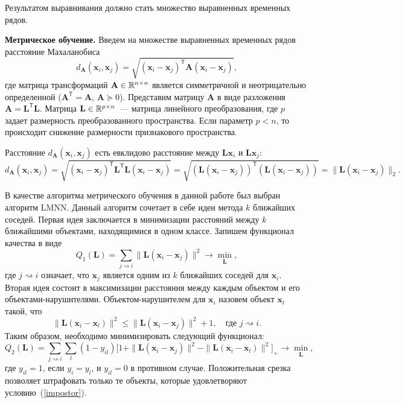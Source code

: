 Результатом выравнивания должно стать множество выравненных временных рядов.

\textbf{Метрическое обучение.}
Введем на множестве выравненных временных рядов расстояние Махаланобиса
\[
d_\mathbf{A} (\mathbf{x}_i, \mathbf{x}_j) = \sqrt{(\mathbf{x}_i - \mathbf{x}_j)^\mathsf{T} \mathbf{A} (\mathbf{x}_i - \mathbf{x}_j)},
\]
где матрица трансформаций $\mathbf{A} \in \mathbb{R}^{n \times n}$ является симметричной и неотрицательно определенной ($\mathbf{A}^\mathsf{T} = \mathbf{A}$, $\mathbf{A} \succeq 0$).
Представим матрицу $\mathbf{A}$ в виде разложения $\mathbf{A} = \mathbf{L}^\mathsf{T}  \mathbf{L}$.
Матрица $\mathbf{L} \in \mathbb{R}^{p \times n}$~--- матрица линейного преобразования, где $p$ задает размерность преобразованного пространства. Если параметр $p < n$, то происходит снижение размерности признакового пространства.

Расстояние $d_\mathbf{A} (\mathbf{x}_i, \mathbf{x}_j)$ есть евклидово расстояние между $\mathbf{Lx}_i$ и $\mathbf{Lx}_j$:
\[
d_\mathbf{A} (\mathbf{x}_i, \mathbf{x}_j) = \sqrt{(\mathbf{x}_i - \mathbf{x}_j)^\mathsf{T} \mathbf{L}^\mathsf{T} \mathbf{L} (\mathbf{x}_i - \mathbf{x}_j)} = \sqrt{(\mathbf{L} (\mathbf{x}_i - \mathbf{x}_j))^\mathsf{T} (\mathbf{L} (\mathbf{x}_i - \mathbf{x}_j))} = \|\mathbf{L} (\mathbf{x}_i - \mathbf{x}_j)\|_2.
\]

В качестве алгоритма метрического обучения в данной работе был выбран алгоритм LMNN. Данный алгоритм сочетает в себе идеи метода $k$ ближайших соседей. Первая идея заключается в минимизации расстояний между $k$ ближайшими объектами, находящимися в одном классе. Запишем функционал качества в виде
\[
Q_1(\mathbf{L}) = \sum_{j \rightsquigarrow i} \|\mathbf{L}(\mathbf{x}_i - \mathbf{x}_j)\|^2 \rightarrow \min_{\mathbf{L}},
\]
где $j \rightsquigarrow i$ означает, что $\mathbf{x}_j$ является одним из $k$ ближайших соседей для $\mathbf{x}_i$.
Вторая идея состоит в максимизации расстояния между каждым объектом и его объектами-нарушителями. Объектом-нарушителем для $\mathbf{x}_i$ назовем объект $\mathbf{x}_l$ такой, что
\begin{equation}
\label{impostor}
\|\mathbf{L}(\mathbf{x}_i - \mathbf{x}_l)\|^2 \leq \|\mathbf{L}(\mathbf{x}_i - \mathbf{x}_j)\|^2 + 1, \quad \text{где $j \rightsquigarrow i$}.
\end{equation}
Таким образом, необходимо минимизировать следующий функционал:
\[
Q_2(\mathbf{L}) = \sum_{j \rightsquigarrow i} \sum_l(1 - y_{il})\bigl[1 + \|\mathbf{L}(\mathbf{x}_i - \mathbf{x}_j)\|^2 - \|\mathbf{L}(\mathbf{x}_i - \mathbf{x}_l)\|^2\bigr]_+ \rightarrow \min_{\mathbf{L}},
\]
где $y_{il} = 1$, если $y_i = y_l$, и $y_{il} = 0$ в противном случае.
Положительная срезка позволяет штрафовать только те объекты, которые удовлетворяют условию~(\ref{impostor}).

